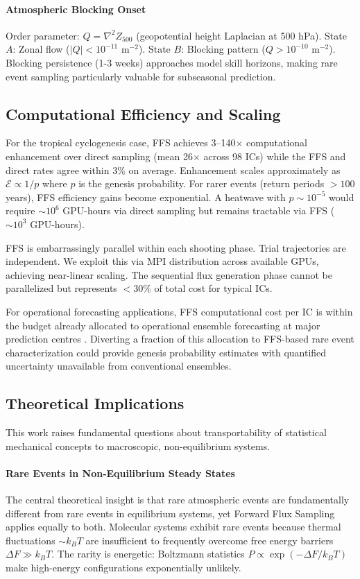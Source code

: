 \documentclass[11pt]{article}
\begin{document}
\paragraph{Atmospheric Blocking Onset}
Order parameter: $Q = \nabla^2 Z_{500}$ (geopotential height Laplacian at 500 hPa). State $A$: Zonal flow ($|Q| < 10^{-11}$ m$^{-2}$). State $B$: Blocking pattern ($Q > 10^{-10}$ m$^{-2}$). Blocking persistence (1-3 weeks) approaches model skill horizons, making rare event sampling particularly valuable for subseasonal prediction.

\subsection{Computational Efficiency and Scaling}

For the tropical cyclogenesis case, FFS achieves 3--140$\times$ computational enhancement over direct sampling (mean 26$\times$ across 98 ICs) while the FFS and direct rates agree within 3\% on average. Enhancement scales approximately as $\mathcal{E} \propto 1/p$ where $p$ is the genesis probability. For rarer events (return periods $> 100$ years), FFS efficiency gains become exponential. A heatwave with $p \sim 10^{-5}$ would require $\sim 10^6$ GPU-hours via direct sampling but remains tractable via FFS ($\sim 10^3$ GPU-hours).

FFS is embarrassingly parallel within each shooting phase. Trial trajectories are independent. We exploit this via MPI distribution across available GPUs, achieving near-linear scaling. The sequential flux generation phase cannot be parallelized but represents $<30\%$ of total cost for typical ICs.

For operational forecasting applications, FFS computational cost per IC is within the budget already allocated to operational ensemble forecasting at major prediction centres \citep{buizza2018ensemble}. Diverting a fraction of this allocation to FFS-based rare event characterization could provide genesis probability estimates with quantified uncertainty unavailable from conventional ensembles.

\subsection{Theoretical Implications}

This work raises fundamental questions about transportability of statistical mechanical concepts to macroscopic, non-equilibrium systems.

\paragraph{Rare Events in Non-Equilibrium Steady States}
The central theoretical insight is that rare atmospheric events are fundamentally different from rare events in equilibrium systems, yet Forward Flux Sampling applies equally to both. Molecular systems exhibit rare events because thermal fluctuations $\sim k_BT$ are insufficient to frequently overcome free energy barriers $\Delta F \gg k_BT$. The rarity is energetic: Boltzmann statistics $P \propto \exp(-\Delta F/k_BT)$ make high-energy configurations exponentially unlikely.
\end{document}
